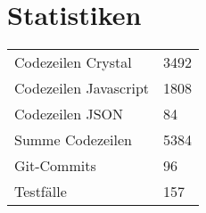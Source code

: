\chapter{Statistiken}
\label{chap:statistiken}

\begin{tabu}{X|l}
	Codezeilen Crystal & 3492 \\
	Codezeilen Javascript & 1808 \\
	Codezeilen JSON & 84 \\
	Summe Codezeilen & 5384 \\
	Git-Commits & 96 \\
	Testfälle & 157 \\
\end{tabu}
